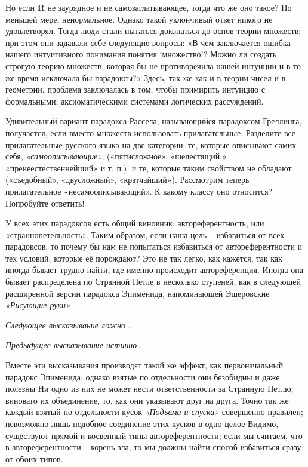 \documentclass[../main.tex]{subfiles}
\begin{document}
Но если \textbf{R} не заурядное и не самозаглатывающее, тогда что же оно такое? По меньшей мере, ненормальное. Однако такой уклончивый ответ никого не удовлетворял. Тогда люди стали пытаться докопаться до основ теории множеств; при этом они задавали себе следующие вопросы: «В чем заключается ошибка нашего интуитивного понимания понятия \enquote*{множество}? Можно ли создать строгую теорию множеств, которая бы не противоречила нашей интуиции и в то же время исключала бы парадоксы?» Здесь, так же как и в теории чисел и в геометрии, проблема заключалась в том, чтобы примирить интуицию с формальными, аксиоматическими системами логических рассуждений.

Удивительный вариант парадокса Рассела, называющийся парадоксом Греллинга, получается, если вместо множеств использовать прилагательные. Разделите все прилагательные русского языка на две категории: те, которые описывают самих себя, \emph{«самоописывающие»,} («пятисложное», «шелестящий,» «пренеестественнейший» и т. п.), и те, которые таким свойством не обладают («съедобный», «двусложный», «кратчайший»). Рассмотрим теперь прилагательное «несамоописывающий». К какому классу оно относится? Попробуйте ответить!

У всех этих парадоксов есть общий виновник: автореферентность, или «страннопетельность». Таким образом, если наша цель \--- избавиться от всех парадоксов, то почему бы нам не попытаться избавиться от автореферентности и тех условий, которые её порождают? Это не так легко, как кажется, так как иногда бывает трудно найти, где именно происходит автореференция. Иногда она бывает распределена по Странной Петле в несколько ступеней, как в следующей расширенной версии парадокса Эпименида, напоминающей Эшеровские \emph{«Рисующие руки» \---}

\emph{Следующее высказывание ложно} .

\emph{Предыдущее высказывание истинно} .

Вместе эти высказывания производят такой же эффект, как первоначальный парадокс Эпименида; однако взятые по отдельности они безобидны и даже полезны Ни одно из них не может нести ответственности за Странную Петлю; виновато их объединение, то, как они указывают друг на друга. Точно так же каждый взятый по отдельности кусок \emph{«Подъема и спуска»} совершенно правилен; невозможно лишь подобное соединение этих кусков в одно целое Видимо, существуют прямой и косвенный типы автореферентности; если мы считаем, что в автореферентности \--- корень зла, то мы должны найти способ избавиться сразу от обоих типов.
\end{document}
